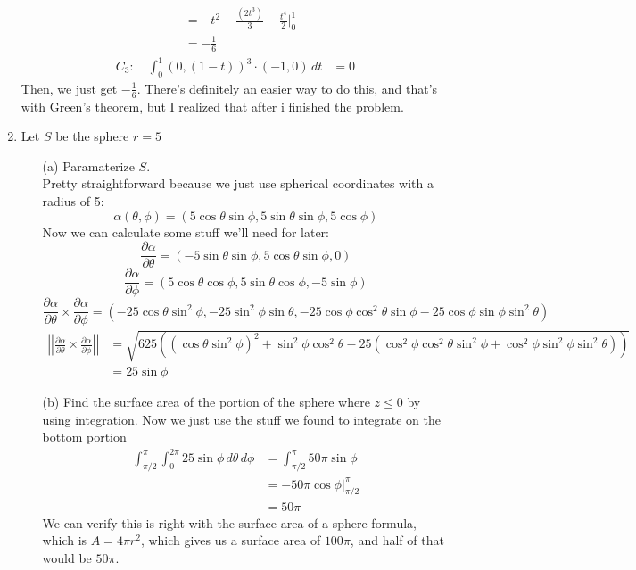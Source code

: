 \documentclass[10pt,oneside]{book}
\newcommand{\prt}[2]{\frac{\partial #1}{\partial #2}}
\newcommand{\dsp}{\displaystyle}
\newcommand{\en}{\vspace{0.25cm}\\}
\begin{document}
\begin{enumerate}
\begin{align*}
        &=-t^2 - \frac{(2 t^3)}3 - \frac{t^4}2\Big|_0^1\\
        &=-\frac{1}6
    \end{align*}
    \begin{align*}
        C_3:\quad\int_0^1(0,(1-t))^3\cdot(-1,0)\,dt &= 0
    \end{align*}
    Then, we just get $\boxed{\dsp-\frac{1}6}$. There's definitely an easier way to do this, and that's with Green's theorem, but I realized that after i finished the problem.
    \item Let $S$ be the sphere $r = 5$
    \begin{enumerate}
        \item [(a)] Paramaterize $S$.\en
        Pretty straightforward because we just use spherical coordinates with a radius of 5:
        \[\alpha(\theta, \phi) = (5\cos\theta\sin\phi, 5\sin\theta\sin\phi, 5\cos\phi)\]
        Now we can calculate some stuff we'll need for later:
        \[\prt{\alpha}{\theta} = (-5\sin\theta\sin\phi, 5\cos\theta\sin\phi, 0)\]
        \[\prt{\alpha}{\phi}= (5\cos\theta\cos\phi, 5\sin\theta\cos\phi, -5\sin\phi)\]
        \[\prt{\alpha}{\theta}\times\prt{\alpha}\phi=(-25 \cos \theta \sin^2 \phi, -25 \sin^2 \phi \sin \theta, -25 \cos \phi \cos^2 \theta \sin\phi - 25 \cos\phi \sin\phi \sin^2\theta)\]
        \begin{align*}\left|\left|\prt{\alpha}{\theta}\times\prt{\alpha}\phi\right|\right| &= \sqrt{625((\cos\theta\sin^2\phi)^2+\sin^2\phi\cos^2\theta-25(\cos^2\phi\cos^2\theta\sin^2\phi+\cos^2\phi\sin^2\phi\sin^2\theta))}\\
            &=25\sin\phi
        \end{align*}
        \item [(b)] Find the surface area of the portion of the sphere where $z\le 0$ by using integration.
        Now we just use the stuff we found to integrate on the bottom portion
        \begin{align*}
            \int_{\pi/2}^{\pi}\int_0^{2\pi}25\sin\phi \,d\theta\,d\phi&=\int_{\pi/2}^\pi 50\pi\sin\phi \\
            &=-50\pi\cos\phi\Big|_{\pi/2}^\pi\\
            &=50\pi
        \end{align*}
        We can verify this is right with the surface area of a sphere formula, which is $A = 4\pi r^2$, which gives us a surface area of $100\pi$, and half of that would be $50\pi$. 
    \end{enumerate}
    \pagebreak

\end{enumerate}
\end{document}
